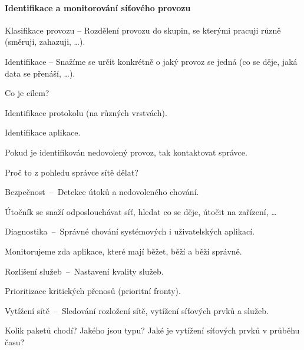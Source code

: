 \paragraph*{Identifikace a monitorování síťového provozu} \begin{compactitem}
    \item Klasifikace provozu -- Rozdělení provozu do skupin, se kterými pracuji různě (směruji, zahazuji, \ldots).

    \item Identifikace -- Snažíme se určit konkrétně o jaký provoz se jedná (co se děje, jaká data se přenáší, \ldots).

    \item Co je cílem? \begin{compactitem}
        \item Identifikace protokolu (na různých vrstvách).
        \item Identifikace aplikace.
        \item Pokud je identifikován nedovolený provoz, tak kontaktovat správce.
    \end{compactitem}

    \item Proč to z pohledu správce sítě dělat? \begin{compactitem}
        \item Bezpečnost~--~Detekce útoků a nedovoleného chování. \begin{compactitem}
            \item Útočník se snaží odposlouchávat síť, hledat co se děje, útočit na zařízení, \ldots
        \end{compactitem}

        \item Diagnostika~--~Správné chování systémových i uživatelských aplikací. \begin{compactitem}
            \item Monitorujeme zda aplikace, které mají běžet, běží a běží správně.
        \end{compactitem}

        \item Rozlišení služeb~--~Nastavení kvality služeb. \begin{compactitem}
            \item Prioritizace kritických přenosů (prioritní fronty).
        \end{compactitem}

        \item Vytížení sítě~--~Sledování rozložení sítě, vytížení síťových prvků a služeb. \begin{compactitem}
            \item Kolik paketů chodí? Jakého jsou typu? Jaké je vytížení síťových prvků v průběhu času?
        \end{compactitem}


\end{compactitem}
\end{compactitem}
